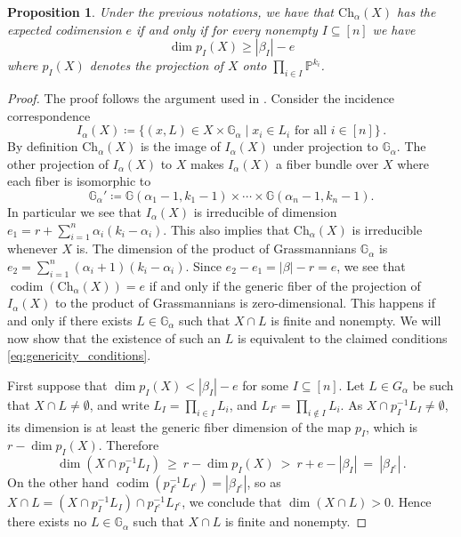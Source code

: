 \documentclass[12pt]{article}
\newtheorem{proposition}[theorem]{Proposition}
\theoremstyle{definition}
\newcommand{\G}{{\mathbb G}}
\def\codim{\operatorname{codim}}
\begin{document}
\begin{proposition}\label{prop: when Chow is of expected codimension}
Under the previous notations, we have that $\mathrm{Ch}_\alpha(X)$ has the expected codimension $e$ if and only if for every nonempty $I \subseteq [n]$ we have
\begin{equation}\label{eq:genericity_conditions}
    \dim p_I(X) \ge |\beta_I|-e
\end{equation}
where $p_I(X)$ denotes the projection of $X$ onto $\prod_{i\in I}\mathbb{P}^{k_i}$.
\end{proposition}
\begin{proof}
The proof follows the argument used in \cite[Proposition 3.1]{osserman2019multigraded}. Consider the incidence correspondence
\begin{equation}\label{eq: incidence}
    I_\alpha(X) \coloneqq \{(x,L)\in X\times \G_\alpha \mid \text{$x_i\in L_i$ for all $i\in[n]$}\}\,.
\end{equation}
By definition $\mathrm{Ch}_\alpha(X)$ is the image of $I_\alpha(X)$ under projection to $\G_\alpha$.
The other projection of $I_\alpha(X)$ to $X$ makes $I_\alpha(X)$ a fiber bundle over $X$ where each fiber is isomorphic to \[
\G_\alpha'\coloneq \G(\alpha_1-1,k_1-1)\times \cdots \times \G(\alpha_n-1,k_n-1).
\]
In particular we see that $I_\alpha(X)$ is irreducible of dimension  $e_1 = r + \sum_{i=1}^n \alpha_i(k_i-\alpha_i)$.
This also implies that $\mathrm{Ch}_\alpha(X)$ is irreducible whenever $X$ is.
The dimension of the product of Grassmannians $\G_\alpha$ is $e_2 =\sum_{i=1}^n (\alpha_i+1)(k_i-\alpha_i)$. Since $e_2-e_1=|\beta|-r=e$, we see that $\codim(\mathrm{Ch}_\alpha(X))=e$ if and only if the generic fiber of the projection of $I_\alpha(X)$ to the product of Grassmannians is zero-dimensional. This happens if and only if there exists $L\in \G_\alpha$ such that $X \cap L$ is finite and nonempty. We will now show that the existence of such an $L$ is equivalent to the claimed conditions \eqref{eq:genericity_conditions}.

\medskip

First suppose that $\dim p_I(X) < |\beta_I|-e$ for some $I \subseteq [n]$.
Let $L\in G_\alpha$ be such that $X \cap L\neq\emptyset$, and write $L_I =\prod_{i \in I} L_i$, and $L_{I^c}=\prod_{i \notin I} L_i$. As $X \cap p_I^{-1} L_I\neq \emptyset$, its dimension is at least the generic fiber dimension of the map $p_I$, which is $r-\dim p_I(X)$. Therefore  
\[
    \dim(X \cap p_I^{-1} L_I)\ \geq\ r-\dim p_I(X)\ >\ r+e-|\beta_I|\ =\ |\beta_{I^c}|\,.
\]
On the other hand $\codim(p_{I^c}^{-1} L_{I^c}) = |\beta_{I^c}|$, so as $X \cap L = (X \cap p_I^{-1} L_I) \cap p_{I^c}^{-1} L_{I^c}$, we conclude that $\dim(X \cap L)>0$. Hence there exists no $L\in \G_\alpha$ such that $X\cap L$ is finite and nonempty.


\end{proof}
\end{document}
